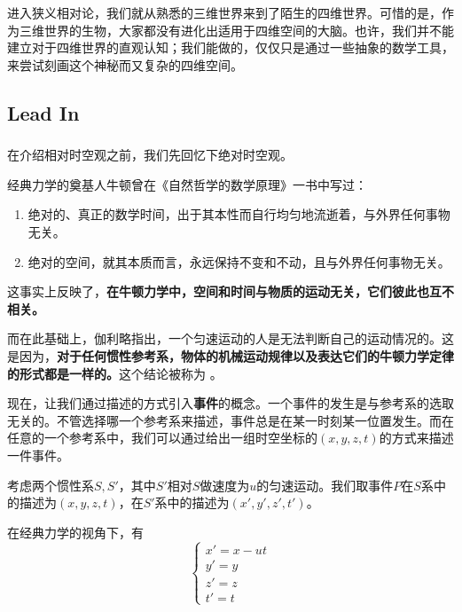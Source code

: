 \chapter[狭义相对论]{}
进入狭义相对论，我们就从熟悉的三维世界来到了陌生的四维世界。可惜的是，作为三维世界的生物，大家都没有进化出适用于四维空间的大脑。也许，我们并不能建立对于四维世界的直观认知；我们能做的，仅仅只是通过一些抽象的数学工具，来尝试刻画这个神秘而又复杂的四维空间。
\section[引入]{Lead In}
\subsection[绝对时空观]{}
在介绍相对时空观之前，我们先回忆下绝对时空观。

经典力学的奠基人牛顿曾在《自然哲学的数学原理》一书中写过：
\begin{enumerate}
    \item 绝对的、真正的数学时间，出于其本性而自行均匀地流逝着，与外界任何事物无关。
    \item 绝对的空间，就其本质而言，永远保持不变和不动，且与外界任何事物无关。
\end{enumerate}

这事实上反映了，\textbf{在牛顿力学中，空间和时间与物质的运动无关，它们彼此也互不相关。}

而在此基础上，伽利略指出，一个匀速运动的人是无法判断自己的运动情况的。这是因为，\textbf{对于任何惯性参考系，物体的机械运动规律以及表达它们的牛顿力学定律的形式都是一样的。}这个结论被称为 。

现在，让我们通过描述的方式引入\textbf{事件}的概念。一个事件的发生是与参考系的选取无关的。不管选择哪一个参考系来描述，事件总是在某一时刻某一位置发生。而在任意的一个参考系中，我们可以通过给出一组时空坐标的$(x,y,z,t)$的方式来描述一件事件。


考虑两个惯性系$S,S'$，其中$S'$相对$S$做速度为$u$的匀速运动。我们取事件$P$在$S$系中的描述为$(x,y,z,t)$，在$S'$系中的描述为$(x',y',z',t')$。

在经典力学的视角下，有
\begin{equation}
    \left\{
    \begin{array}{l}
        x'=x-ut \\
        y'=y    \\
        z'=z    \\
        t'=t
    \end{array}
    \right.
\end{equation}

